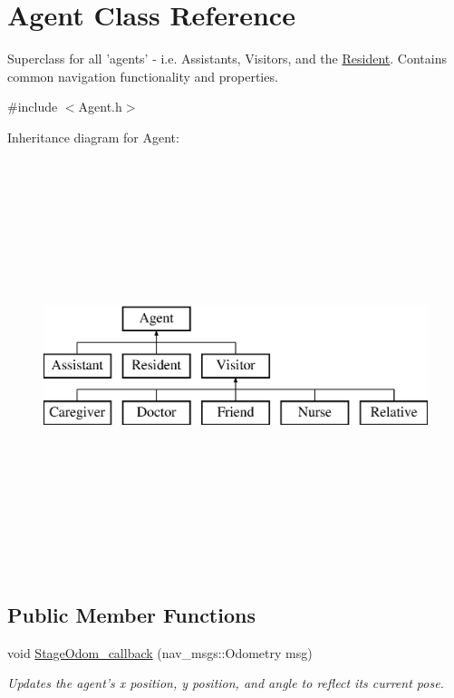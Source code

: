 \hypertarget{classAgent}{\section{Agent Class Reference}
\label{classAgent}
}


Superclass for all 'agents' -\/ i.\-e. Assistants, Visitors, and the \hyperlink{classResident}{Resident}. Contains common navigation functionality and properties.  




{\ttfamily \#include $<$Agent.\-h$>$}

Inheritance diagram for Agent\-:\begin{figure}[H]
\begin{center}
\leavevmode
\includegraphics[height=12.000000cm]{classAgent}
\end{center}
\end{figure}
\subsection*{Public Member Functions}
\begin{DoxyCompactItemize}
\item 
void \hyperlink{classAgent_aef22675e420206ed848583c89f38f8f0}{Stage\-Odom\-\_\-callback} (nav\-\_\-msgs\-::\-Odometry msg)
\begin{DoxyCompactList}\small\item\em Updates the agent's x position, y position, and angle to reflect its current pose. \end{DoxyCompactList}\end{DoxyCompactItemize}
